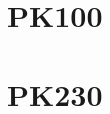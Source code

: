 \documentclass{report}
\begin{document}
\newpage
\section{PK100}


\newpage
\section{PK230}


% 

%
% 
% 
% 
% 
% 
% 
% 
% 
% 
\end{document}
